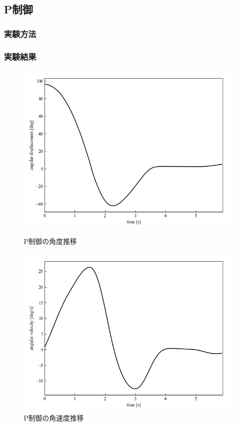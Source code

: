 \newpage

\subsection{P制御}
\subsubsection{実験方法}
\subsubsection{実験結果}

\begin{figure}[h]
	\centering
	\begin{minipage}{0.43\columnwidth}
	  \centering
	  \includegraphics[width=\columnwidth]{./figure/Pdeg.png}
	  \caption{P制御の角度推移}
	  \label{fig:Pdeg}
	\end{minipage}
	\hspace{5mm}
	\begin{minipage}{0.43\columnwidth}
	  \centering
	  \includegraphics[width=\columnwidth]{./figure/Pdegpers.png}
	  \caption{P制御の角速度推移}
	  \label{fig:Pdegpers}
	\end{minipage}
  \end{figure}

